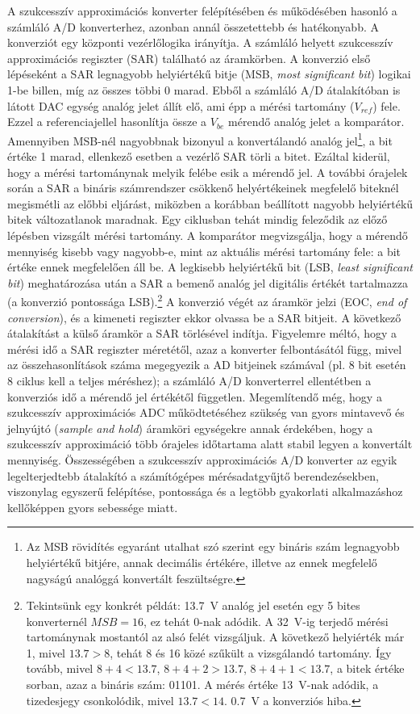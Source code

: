 \documentclass[12pt]{article}
\theoremstyle{plain}
\begin{document}
A szukcesszív approximációs konverter felépítésében és működésében hasonló a számláló A/D konverterhez, azonban annál összetettebb és hatékonyabb. A konverziót egy központi vezérlőlogika irányítja. A számláló helyett szukcesszív approximációs regiszter (SAR) található az áramkörben. A konverzió első lépéseként a SAR legnagyobb helyiértékű bitje (MSB, \textit{most significant bit}) logikai 1-be billen, míg az összes többi 0 marad. Ebből a számláló A/D átalakítóban is látott DAC egység analóg jelet állít elő, ami épp a mérési tartomány ($V_{ref}$) fele. Ezzel a referenciajellel hasonlítja össze a $V_{be}$ mérendő analóg jelet a komparátor. Amennyiben MSB-nél nagyobbnak bizonyul a konvertálandó analóg jel\footnote{Az MSB rövidítés egyaránt utalhat szó szerint egy bináris szám legnagyobb helyiértékű bitjére, annak decimális értékére, illetve az ennek megfelelő nagyságú analóggá konvertált feszültségre.}, a bit értéke 1 marad, ellenkező esetben a vezérlő SAR törli a bitet. Ezáltal kiderül, hogy a mérési tartománynak melyik felébe esik a mérendő jel. 
A további órajelek során a SAR a bináris számrendszer csökkenő helyértékeinek megfelelő biteknél megismétli az előbbi eljárást, miközben a korábban beállított nagyobb helyiértékű bitek változatlanok maradnak. Egy ciklusban tehát mindig feleződik az előző lépésben vizsgált mérési tartomány. A komparátor megvizsgálja, hogy a mérendő mennyiség kisebb vagy nagyobb-e, mint az aktuális mérési tartomány fele: a bit értéke ennek megfelelően áll be. A legkisebb helyiértékű bit (LSB, \textit{least significant bit}) meghatározása után a SAR a bemenő analóg jel digitális értékét tartalmazza (a konverzió pontossága LSB).\footnote{Tekintsünk egy konkrét példát: 13.7~V analóg jel esetén egy 5 bites konverternél $MSB=16$, ez tehát 0-nak adódik. A 32~V-ig terjedő mérési tartománynak mostantól az alsó felét vizsgáljuk. A következő helyiérték már 1, mivel $13.7>8$, tehát 8 és 16 közé szűkült a vizsgálandó tartomány. Így tovább, mivel $8+4<13.7$, $8+4+2>13.7$, $8+4+1<13.7$, a bitek értéke sorban, azaz a bináris szám: 01101. A mérés értéke 13~V-nak adódik, a tizedesjegy csonkolódik, mivel $13.7<14$. 0.7~V a konverziós hiba.}
A konverzió végét az áramkör jelzi (EOC, \textit{end of conversion}), és a kimeneti regiszter ekkor olvassa be a SAR bitjeit. A következő átalakítást a külső áramkör a SAR törlésével indítja.
Figyelemre méltó, hogy a mérési idő a SAR regiszter méretétől, azaz a konverter felbontásától függ, mivel az összehasonlítások száma megegyezik a AD bitjeinek számával (pl. 8 bit esetén 8 ciklus kell a teljes méréshez); a számláló A/D konverterrel ellentétben a konverziós idő a mérendő jel értékétől független. Megemlítendő még, hogy a szukcesszív approximációs ADC működtetéséhez szükség van gyors mintavevő és jelnyújtó (\textit{sample and hold}) áramköri egységekre annak érdekében, hogy a szukcesszív approximáció több órajeles időtartama alatt stabil legyen a konvertált mennyiség. Összességében a szukcesszív approximációs A/D konverter az egyik legelterjedtebb átalakító a számítógépes mérésadatgyűjtő berendezésekben, viszonylag egyszerű felépítése, pontossága és a legtöbb gyakorlati alkalmazáshoz kellőképpen gyors sebessége miatt.
\end{document}
